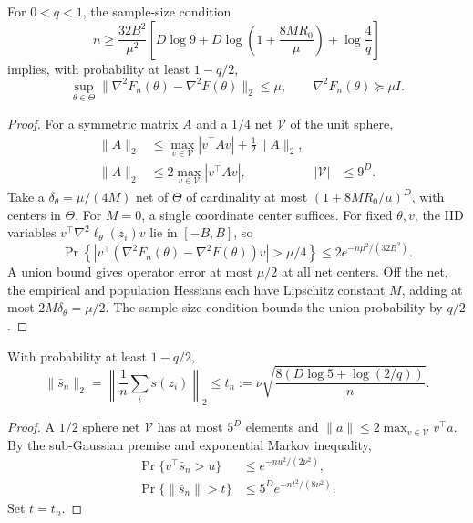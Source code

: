 \begin{lemma}
\label{lem:local-Hessian-concentration}
For $0<q<1$, the sample-size condition
\begin{equation}
n\geq\frac{32B^2}{\mu^2}
\left[D\log9+
D\log\left(1+\frac{8MR_0}{\mu}\right)+\log\frac4q\right]
\label{eq:local-Hessian-sample}
\end{equation}
implies, with probability at least $1-q/2$,
\begin{equation}
\sup_{\theta\in\Theta}
\|\nabla^2F_n(\theta)-\nabla^2F(\theta)\|_2\leq\mu,
\qquad \nabla^2F_n(\theta)\succeq\mu I .
\end{equation}
\end{lemma}
\begin{proof}
For a symmetric matrix $A$ and a $1/4$ net $\mathcal V$ of the unit
sphere,
\begin{align}
\|A\|_2&\leq
\max_{v\in\mathcal V}|v^\top Av|+\tfrac12\|A\|_2,\\
\|A\|_2&\leq2\max_{v\in\mathcal V}|v^\top Av|,&
|\mathcal V|&\leq9^D .
\end{align}
Take a $\delta_\theta=\mu/(4M)$ net of $\Theta$ of cardinality
at most $(1+8MR_0/\mu)^D$, with centers in $\Theta$.
For $M=0$, a single coordinate center suffices.
For fixed $\theta,v$, the IID variables
$v^\top\nabla^2\ell_\theta(z_i)v$ lie in $[-B,B]$, so
\begin{equation}
\Pr\left\{\left|v^\top
(\nabla^2F_n(\theta)-\nabla^2F(\theta))v\right|>\mu/4\right\}
\leq2e^{-n\mu^2/(32B^2)} .
\end{equation}
A union bound gives operator error at most $\mu/2$ at all net
centers. Off the net, the empirical and population Hessians each
have Lipschitz constant $M$, adding at most
$2M\delta_\theta=\mu/2$. The sample-size condition bounds the union
probability by $q/2$.
\end{proof}

\begin{lemma}
With probability at least $1-q/2$,
\begin{equation}
\|\bar s_n\|_2
=\left\|\frac1n\sum_i s(z_i)\right\|_2
\leq t_n
:=\nu\sqrt{\frac{8(D\log5+\log(2/q))}{n}} .
\label{eq:local-score-concentration}
\end{equation}
\end{lemma}
\begin{proof}
A $1/2$ sphere net $\mathcal V$ has at most $5^D$ elements and
$\|a\|\leq2\max_{v\in\mathcal V}v^\top a$.
By the sub-Gaussian premise and exponential Markov inequality,
\begin{align}
\Pr\{v^\top\bar s_n>u\}&\leq e^{-nu^2/(2\nu^2)},\\
\Pr\{\|\bar s_n\|>t\}&\leq5^De^{-nt^2/(8\nu^2)} .
\end{align}
Set $t=t_n$.
\end{proof}


